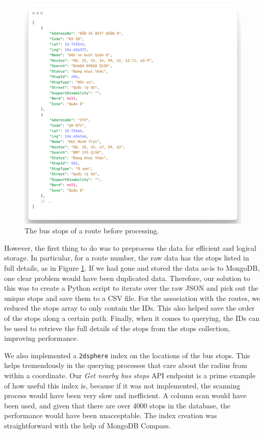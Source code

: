 \begin{figure}
    \centering
    \includegraphics[width=\textwidth]{assets/images/Implementation/raw_stops.png}
    \caption{The bus stops of a route before processing.}
    \label{fig:raw_stops}
\end{figure}

However, the first thing to do was to preprocess the data for efficient and logical storage. In particular, for a route number, the raw data has the stops listed in full details, as in Figure \ref{fig:raw_stops}. If we had gone and stored the data as-is to MongoDB, one clear problem would have been duplicated data. Therefore, our solution to this was to create a Python script to iterate over the raw JSON and pick out the unique stops and save them to a CSV file. For the association with the routes, we reduced the stops array to only contain the IDs. This also helped save the order of the stops along a certain path. Finally, when it comes to querying, the IDs can be used to retrieve the full details of the stops from the stops collection, improving performance.

We also implemented a \lstinline{2dsphere} index on the locations of the bus stops. This helps tremendously in the querying processes that care about the radius from within a coordinate. Our \textit{Get nearby bus stops} API endpoint is a prime example of how useful this index is, because if it was not implemented, the scanning process would have been very slow and inefficient. A column scan would have been used, and given that there are over 4000 stops in the database, the performance would have been unacceptable. The index creation was straightforward with the help of MongoDB Compass.

